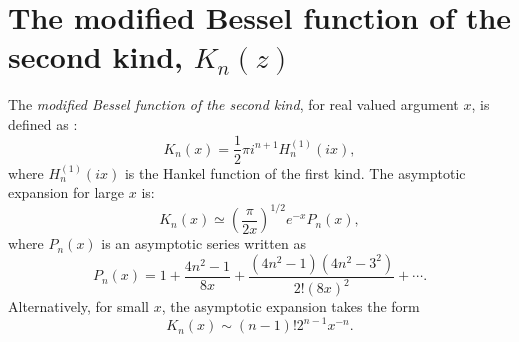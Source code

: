 \section{The modified Bessel function of the second kind, $K_n (z)$}

The \textit{modified Bessel function of the second kind}, for real valued argument $x$, is defined as \cite{RN780}:
\begin{equation}
K_n (x) = \frac{1}{2}\pi i^{n+1} H^{(1)}_n (ix),
\end{equation}
where $H^{(1)}_n (ix)$ is the Hankel function of the first kind. The asymptotic expansion for large $x$ is:
\begin{equation}
K_n (x) \simeq \left( \frac{\pi}{2x}\right)^{1/2} e^{-x} P_n (x),
\end{equation}
where $P_n (x)$ is an asymptotic series written as
\begin{equation}
P_n (x) = 1 + \frac{4n^2-1}{8x}+\frac{(4n^2-1)(4n^2-3^2)}{2!(8x)^2}+\cdots.
\end{equation}
Alternatively, for small $x$, the asymptotic expansion takes the form
\begin{equation}
K_n (x) \sim (n-1)!2^{n-1}x^{-n}.
\end{equation}